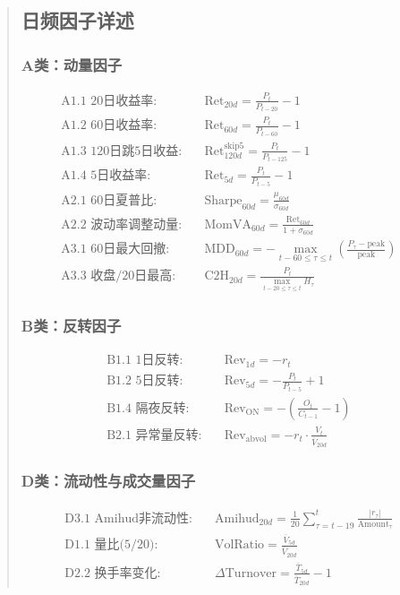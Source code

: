 \documentclass[12pt,a4paper]{article}
\begin{document}
\begin{abstract}
\subsection{日频因子详述}

\subsubsection{A类：动量因子}
\begin{align}
    \text{A1.1 20日收益率:} &\quad \text{Ret}_{20d} = \frac{P_t}{P_{t-20}} - 1 \\
    \text{A1.2 60日收益率:} &\quad \text{Ret}_{60d} = \frac{P_t}{P_{t-60}} - 1 \\
    \text{A1.3 120日跳5日收益:} &\quad \text{Ret}_{120d}^{\text{skip5}} = \frac{P_t}{P_{t-125}} - 1 \\
    \text{A1.4 5日收益率:} &\quad \text{Ret}_{5d} = \frac{P_t}{P_{t-5}} - 1 \\
    \text{A2.1 60日夏普比:} &\quad \text{Sharpe}_{60d} = \frac{\mu_{60d}}{\sigma_{60d}} \\
    \text{A2.2 波动率调整动量:} &\quad \text{MomVA}_{60d} = \frac{\text{Ret}_{60d}}{1 + \sigma_{60d}} \\
    \text{A3.1 60日最大回撤:} &\quad \text{MDD}_{60d} = -\max_{t-60 \leq \tau \leq t}\left(\frac{P_\tau - \text{peak}}{\text{peak}}\right) \\
    \text{A3.3 收盘/20日最高:} &\quad \text{C2H}_{20d} = \frac{P_t}{\max_{t-20 \leq \tau \leq t} H_\tau}
\end{align}

\subsubsection{B类：反转因子}
\begin{align}
    \text{B1.1 1日反转:} &\quad \text{Rev}_{1d} = -r_t \\
    \text{B1.2 5日反转:} &\quad \text{Rev}_{5d} = -\frac{P_t}{P_{t-5}} + 1 \\
    \text{B1.4 隔夜反转:} &\quad \text{Rev}_{\text{ON}} = -\left(\frac{O_t}{C_{t-1}} - 1\right) \\
    \text{B2.1 异常量反转:} &\quad \text{Rev}_{\text{abvol}} = -r_t \cdot \frac{V_t}{\bar{V}_{20d}}
\end{align}

\subsubsection{D类：流动性与成交量因子}
\begin{align}
    \text{D3.1 Amihud非流动性:} &\quad \text{Amihud}_{20d} = \frac{1}{20}\sum_{\tau=t-19}^{t} \frac{|r_\tau|}{\text{Amount}_\tau} \\
    \text{D1.1 量比(5/20):} &\quad \text{VolRatio} = \frac{\bar{V}_{5d}}{\bar{V}_{20d}} \\
    \text{D2.2 换手率变化:} &\quad \Delta\text{Turnover} = \frac{\bar{T}_{5d}}{\bar{T}_{20d}} - 1
\end{align}


\end{abstract}
\end{document}
